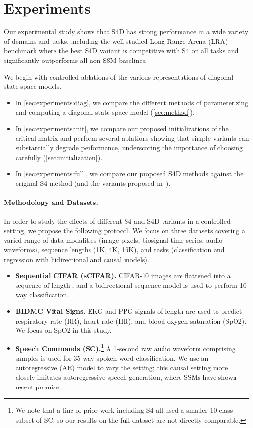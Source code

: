 \documentclass{article}
\newcommand{\para}[1]{\paragraph{#1}}
\begin{document}
 
\section{Experiments}
\label{sec:experiments}


Our experimental study shows that S4D has strong performance in a wide variety of domains and tasks,
including the well-studied Long Range Arena (LRA) benchmark where the best S4D variant is competitive with S4 on all tasks and significantly outperforms all non-SSM baselines.

We begin with controlled ablations of the various representations of diagonal state space models.
\begin{itemize}\item In \cref{sec:experiments:diag}, we compare the different methods of parameterizing and computing a diagonal state space model (\cref{sec:method}).
  \item In \cref{sec:experiments:init}, we compare our proposed initializations of the critical  matrix and perform several ablations showing that simple variants can substantially degrade performance, underscoring the importance of choosing  carefully (\cref{sec:initialization}).
  \item In \cref{sec:experiments:full}, we compare our proposed S4D methods against the original S4 method (and the variants proposed in~\citep{gu2022hippo}).
\end{itemize}


\para{Methodology and Datasets.}
In order to study the effects of different S4 and S4D variants in a controlled setting, we propose the following protocol.
We focus on three datasets covering a varied range of
data modalities (image pixels, biosignal time series, audio waveforms), sequence lengths (1K, 4K, 16K), and tasks (classification and regression with bidirectional and causal models).
\begin{itemize}[leftmargin=*,itemsep=0pt]\item \textbf{Sequential CIFAR (sCIFAR).} CIFAR-10 images are flattened into a sequence of length , and a bidirectional sequence model is used to perform 10-way classification.
  \item \textbf{BIDMC Vital Signs.} EKG and PPG signals of length  are used to predict respiratory rate (RR), heart rate (HR), and blood oxygen saturation (SpO2). We focus on SpO2 in this study.
  \item \textbf{Speech Commands (SC).}\footnote{We note that a line of prior work including S4 \citep{kidger2020neural,romero2021ckconv,gu2022efficiently} all used a smaller 10-class subset of SC, so our results on the full dataset are not directly comparable.}
    A 1-second raw audio waveform comprising  samples is used for 35-way spoken word classification. We use an autoregressive (AR) model to vary the setting; this causal setting more closely imitates autoregressive speech generation, where SSMs have shown recent promise \citep{goel2022sashimi}.
\end{itemize}
\end{document}
